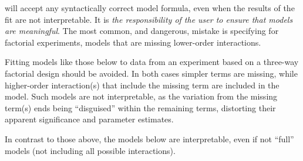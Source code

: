 \documentclass[krantz2]{krantz}\usepackage{knitr}
\begin{document}
\begin{warningbox}
  \Rlang will accept any syntactically correct model formula, even when the results of the fit are not interpretable. It is \emph{the responsibility of the user to ensure that models are meaningful}. The most common, and dangerous, mistake is specifying for factorial experiments, models that are missing lower-order interactions.

  Fitting models like those below to data from an experiment based on a three-way factorial design should be avoided. In both cases simpler terms are missing, while higher-order interaction(s) that include the missing term are included in the model. Such models are not interpretable, as the variation from the missing term(s) ends being ``disguised'' within the remaining terms, distorting their apparent significance and parameter estimates.

\begin{knitrout}\footnotesize
{}\color{fgcolor}\begin{kframe}
\begin{alltt}
 \hlopt{~}  \hlopt{+}  \hlopt{+} \hlopt{:} \hlopt{+} \hlopt{:} \hlopt{+} \hlopt{:}
 \hlopt{~}  \hlopt{+}  \hlopt{+}  \hlopt{+} \hlopt{:} \hlopt{+} \hlopt{:} \hlopt{+} \hlopt{:}\hlopt{:}
\end{alltt}
\end{kframe}
\end{knitrout}

  In contrast to those above, the models below are interpretable, even if not ``full'' models (not including all possible interactions).

\begin{knitrout}\footnotesize
{}\color{fgcolor}\begin{kframe}
\begin{alltt}
 \hlopt{~}  \hlopt{+}  \hlopt{+}  \hlopt{+} \hlopt{:} \hlopt{+} \hlopt{:} \hlopt{+} \hlopt{:}
 \hlopt{~}  \hlopt{+}  \hlopt{+} \hlopt{^}
 \hlopt{~}  \hlopt{+}  \hlopt{+}  \hlopt{+} \hlopt{:}
 \hlopt{~}  \hlopt{+}  \hlopt{*} 
\end{alltt}
\end{kframe}
\end{knitrout}

\end{warningbox}
\end{document}
